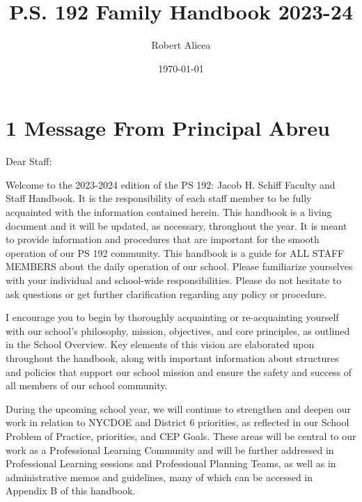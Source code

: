 \documentclass[11pt]{article}
\author{Robert Alicea}
\date{\today}
\title{P.S. 192 Family Handbook 2023-24}
\begin{document}


\pagenumbering{\fancyhf{}}
\pagestyle{headings}

\fancyhead[R]{\thepage}

\pagestyle{fancy}
\renewcommand{\footrulewidth}{1px}


\clearpage
\clearpage \tableofcontents \clearpage

\section{1 Message From Principal Abreu}
\label{sec:org9f97bfb}

Dear Staff:

Welcome to the 2023-2024 edition of the PS 192: Jacob H. Schiff Faculty and Staff Handbook. It is the responsibility of each staff member to be fully acquainted with the information contained herein. This handbook is a living document and it will be updated, as necessary, throughout the year. It is meant to provide information and procedures that are important for the smooth operation of our PS 192 community. This handbook is a guide for ALL STAFF MEMBERS about the daily operation of our school. Please familiarize yourselves with your individual and school-wide responsibilities. Please do not hesitate to ask questions or get further clarification regarding any policy or procedure.

I encourage you to begin by thoroughly acquainting or re-acquainting yourself with our school’s philosophy, mission, objectives, and core principles, as outlined in the School Overview. Key elements of this vision are elaborated upon throughout the handbook, along with important information about structures and policies that support our school mission and ensure the safety and success of all members of our school community.

During the upcoming school year, we will continue to strengthen and deepen our work in relation to NYCDOE and District 6 priorities, as reflected in our School Problem of Practice, priorities, and CEP Goals. These areas will be central to our work as a Professional Learning Community and will be further addressed in Professional Learning sessions and Professional Planning Teams, as well as in administrative memos and guidelines, many of which can be accessed in Appendix B of this handbook.
\end{document}
